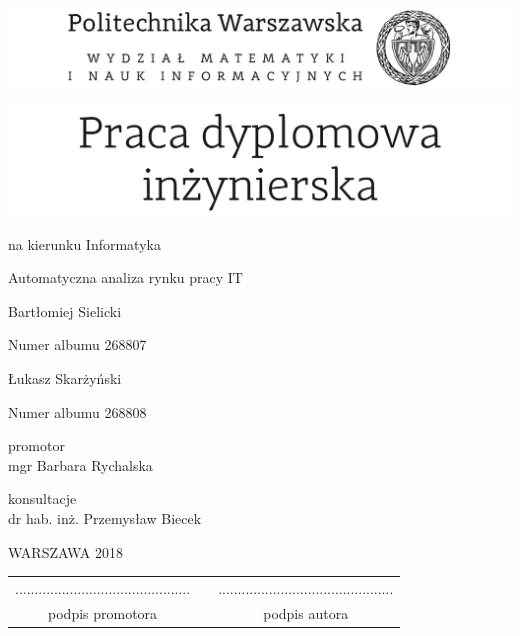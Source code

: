 \documentclass[12pt,twoside,a4paper]{article}
\def\discipline{Informatyka} %
\def\title{Automatyczna analiza rynku pracy IT}
\def\authori{Bartłomiej Sielicki}
\def\albumi{268807}
\def\authorii{Łukasz Skarżyński}
\def\albumii{268808}
\def\supervisor{mgr Barbara Rychalska}
\def\year{2018}
\begin{document}
\sloppy
\pagestyle{empty}


\includegraphics[scale=1.]{politechnika} 

\begin{center}
\vspace{40pt}

\includegraphics[scale=1.]{praca_inz}  %

{ \arial na kierunku \discipline

\vspace{30pt}
{\arial \large \title}

\vspace{40pt}

{\arial \huge \authori }

\vspace{5pt}

Numer albumu \albumi

\vspace {20pt}
{\arial \huge \authorii}

\vspace{5pt}

Numer albumu \albumii

\vspace{40pt}

promotor \\
{\arial \supervisor}

\vspace{15pt}
 
konsultacje  \\
{\arial dr hab. inż. Przemysław Biecek }

 \vfill
WARSZAWA \year \\
}
\end{center}


\newpage
\null

\vfill

\begin{center}
\begin{tabular}[t]{ccc}
............................................. & \hspace*{100pt} & .............................................\\
podpis promotora & \hspace*{100pt} & podpis autora
\end{tabular}
\end{center}
\end{document}
